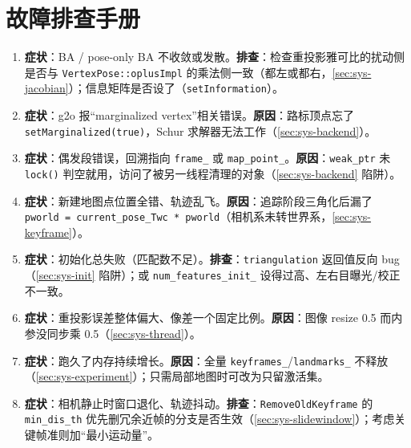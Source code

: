 \section*{故障排查手册}
\begin{enumerate}
  \item \textbf{症状}：BA / pose-only BA 不收敛或发散。\textbf{排查}：检查重投影雅可比的扰动侧是否与 \texttt{VertexPose::oplusImpl} 的乘法侧一致（都左或都右，\cref{sec:sys-jacobian}）；信息矩阵是否设了（\verb|setInformation|）。
  \item \textbf{症状}：g2o 报“marginalized vertex”相关错误。\textbf{原因}：路标顶点忘了 \verb|setMarginalized(true)|，Schur 求解器无法工作（\cref{sec:sys-backend}）。
  \item \textbf{症状}：偶发段错误，回溯指向 \texttt{frame\_} 或 \texttt{map\_point\_}。\textbf{原因}：\texttt{weak\_ptr} 未 \texttt{lock()} 判空就用，访问了被另一线程清理的对象（\cref{sec:sys-backend} 陷阱）。
  \item \textbf{症状}：新建地图点位置全错、轨迹乱飞。\textbf{原因}：追踪阶段三角化后漏了 \verb|pworld = current_pose_Twc * pworld|（相机系未转世界系，\cref{sec:sys-keyframe}）。
  \item \textbf{症状}：初始化总失败（匹配数不足）。\textbf{排查}：\texttt{triangulation} 返回值反向 bug（\cref{sec:sys-init} 陷阱）；或 \texttt{num\_features\_init\_} 设得过高、左右目曝光/校正不一致。
  \item \textbf{症状}：重投影误差整体偏大、像差一个固定比例。\textbf{原因}：图像 resize 0.5 而内参没同步乘 0.5（\cref{sec:sys-thread}）。
  \item \textbf{症状}：跑久了内存持续增长。\textbf{原因}：全量 \texttt{keyframes\_}/\texttt{landmarks\_} 不释放（\cref{sec:sys-experiment}）；只需局部地图时可改为只留激活集。
  \item \textbf{症状}：相机静止时窗口退化、轨迹抖动。\textbf{排查}：\texttt{RemoveOldKeyframe} 的 \texttt{min\_dis\_th} 优先删冗余近帧的分支是否生效（\cref{sec:sys-slidewindow}）；考虑关键帧准则加“最小运动量”。
\end{enumerate}
